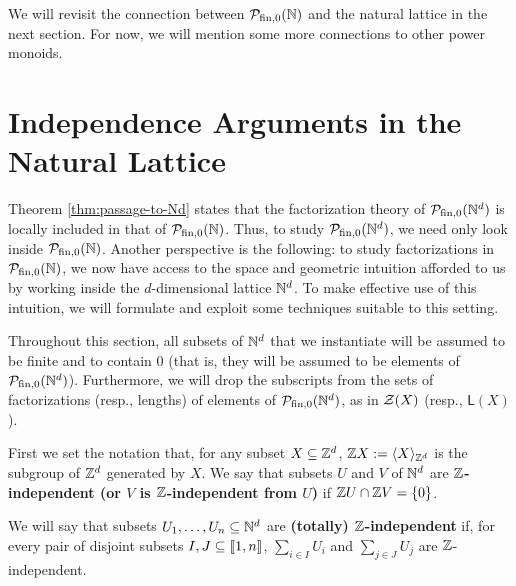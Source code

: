 We will revisit the connection between ${\mathcal{P}_{\textrm{fin},0}(\mathbb{N})}$ and the natural lattice in the next section.
For now, we will mention some more connections to other power monoids.










\section{Independence Arguments in the Natural Lattice}

Theorem \ref{thm:passage-to-Nd} states that the factorization theory of $\mathcal{P}_{\textrm{fin}, 0}(\mathbb{N}^d)$ is locally included in that of ${\mathcal{P}_{\textrm{fin},0}(\mathbb{N})}$.
Thus, to study $\mathcal{P}_{\textrm{fin}, 0}(\mathbb{N}^d)$, we need only look inside ${\mathcal{P}_{\textrm{fin},0}(\mathbb{N})}$. 
Another perspective is the following: to study factorizations in ${\mathcal{P}_{\textrm{fin},0}(\mathbb{N})}$, we now have access to the space and geometric intuition afforded to us by working inside the $d$-dimensional lattice $\mathbb{N}^d$.
To make effective use of this intuition, we will formulate and exploit some techniques suitable to this setting.

Throughout this section, all subsets of $\mathbb{N}^d$ that we instantiate will be assumed to be finite and to contain $0$ (that is, they will be assumed to be elements of $\mathcal{P}_{\textrm{fin}, 0}(\mathbb{N}^d)$).
Furthermore, we will drop the subscripts from the sets of factorizations (resp., lengths) of elements of $\mathcal{P}_{\textrm{fin}, 0}(\mathbb{N}^d)$, as in $\mathcal{Z}(X)$ (resp., $\mathsf{L}(X)$).

\begin{defn}
First we set the notation that, for any subset $X \subseteq \mathbb{Z}^d$, $\mathbb{Z} X := \langle X \rangle_{\mathbb{Z}^d}$ is the subgroup of $\mathbb{Z}^d$ generated by $X$.
We say that subsets $U$ and $V$ of $\mathbb{N}^d$ are \textbf{$\mathbb{Z}$-independent (or $V$ is $\mathbb{Z}$-independent from $U$)} if $\mathbb{Z} U \cap \mathbb{Z} V = \{0\}$.

We will say that subsets $U_1,\dots, U_n\subseteq \mathbb{N}^d$ are \textbf{(totally) $\mathbb{Z}$-independent} if, for every pair of disjoint subsets $I,J\subseteq\llbracket 1,n \rrbracket$, $\sum_{i\in I} U_i$ and $\sum_{j\in J} U_j$ are $\mathbb{Z}$-independent.
\end{defn}

